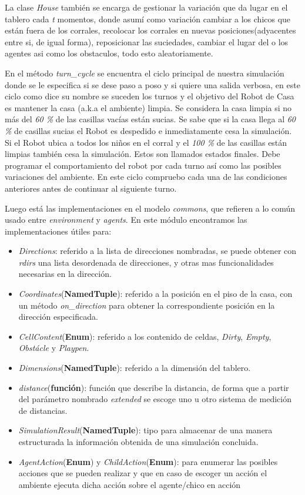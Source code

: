 \documentclass[a4paper,10pt,twocolumn]{article}
\begin{document}
 La clase \textit{House} tambi\'en se encarga de gestionar la variaci\'on que da lugar en el tablero cada \textit{t} momentos, donde asum\'i como variaci\'on cambiar a los chicos que est\'an fuera de los corrales, recolocar los corrales en nuevas posiciones(adyacentes entre si, de igual forma), reposicionar las suciedades, cambiar el lugar del o los agentes  asi como los obstaculos, todo esto aleatoriamente.
 
 En el m\'etodo \textit{turn\_cycle} se encuentra el ciclo principal de nuestra simulaci\'on donde se le especifica si se dese paso a poso y si quiere una salida verbosa, en este ciclo como dice su nombre se suceden los turnos y el objetivo del Robot de Casa es mantener la casa (a.k.a el ambiente) limpia. Se considera la casa limpia si no m\'as del \textit{60 \%} de las casillas vac\'ias est\'an sucias. Se sabe que si la casa llega al \textit{60 \%} de casillas sucias el Robot es despedido e inmediatamente cesa la simulaci\'on. Si el Robot ubica a todos los ni\~nos en el corral y el \textit{100 \%} de las casillas est\'an limpias tambi\'en cesa la simulaci\'on. Estos son llamados estados finales. Debe programar el comportamiento del robot por cada turno as\'i como las posibles variaciones del ambiente. En este ciclo compruebo cada una de las condiciones anteriores antes de continuar al siguiente turno.
 
 Luego est\'a las implementaciones en el modelo \textit{commons}, que refieren a lo com\'un usado entre \textit{environment} y \textit{agents}. En este m\'odulo encontramos las implementaciones \'utiles para:
 \begin{itemize}
 	\item \textit{Directions}: referido a la lista de direcciones nombradas, se puede obtener con \textit{rdirs} una lista desordenada de direcciones, y otras mas funcionalidades necesarias en la direcci\'on.
 	\item \textit{Coordinates}(\textbf{NamedTuple}): referido a la posici\'on en el piso de la casa, con un m\'etodo \textit{on\_direction} para obtener la correspondiente posici\'on en la direcci\'on especificada.
 	\item \textit{CellContent}(\textbf{Enum}): referido a los contenido de celdas, \textit{Dirty}, \textit{Empty}, \textit{Obst\'acle} y \textit{Playpen}.
 	\item \textit{Dimensions}(\textbf{NamedTuple}): referido a la dimensi\'on del tablero.
 	\item \textit{distance}(\textbf{funci\'on}):  funci\'on que describe la distancia, de forma que a partir del par\'ametro nombrado \textit{extended} se escoge uno u otro sistema de medici\'on de distancias.
 	\item \textit{SimulationResult}(\textbf{NamedTuple}): tipo para almacenar de una manera estructurada la informaci\'on obtenida de una simulaci\'on concluida.
 	\item \textit{AgentAction}(\textbf{Enum}) y \textit{ChildAction}(\textbf{Enum}): para enumerar las posibles acciones que se pueden realizar y que en caso de escoger un acci\'on el ambiente ejecuta dicha acci\'on sobre el agente/chico en acci\'on
 \end{itemize}
\end{document}
